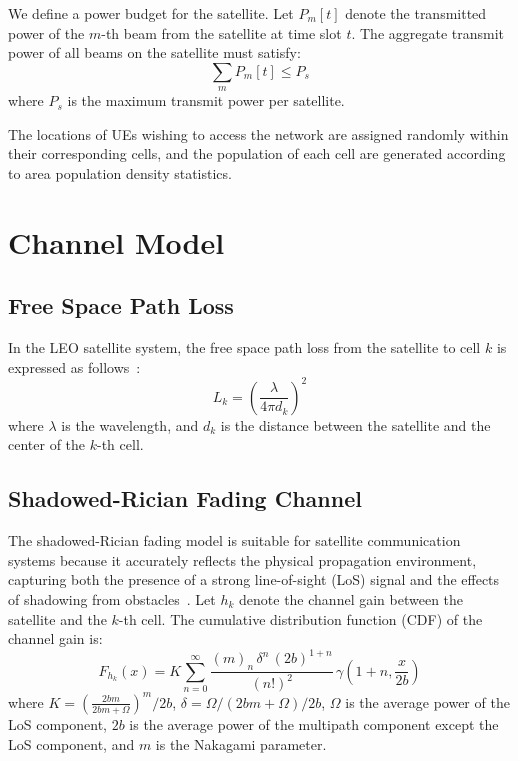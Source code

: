 We define a power budget for the satellite. Let $P_{m}[t]$ denote the transmitted power of the $m$-th beam from the satellite at time slot $t$. The aggregate transmit power of all beams on the satellite must satisfy:
\begin{equation}
    \sum_{m} P_{m}[t] \leq P_s
\end{equation}
where $P_s$ is the maximum transmit power per satellite.

The locations of UEs wishing to access the network are assigned randomly within their corresponding cells, and the population of each cell are generated according to area population density statistics.

\section{Channel Model}

\subsection{Free Space Path Loss}
In the LEO satellite system, the free space path loss from the satellite to cell $k$ is expressed as follows~\cite{Satellite-Multi-Beam}:
\begin{equation}
    L_{k} = \left(\frac{\lambda}{4\pi d_{k}}\right)^2
\end{equation}
where $\lambda$ is the wavelength, and $d_{k}$ is the distance between the satellite and the center of the $k$-th cell.

\subsection{Shadowed-Rician Fading Channel}
The shadowed-Rician fading model is suitable for satellite communication systems because it accurately reflects the physical propagation environment, capturing both the presence of a strong line-of-sight (LoS) signal and the effects of shadowing from obstacles~\cite{channel-model}. Let $h_{k}$ denote the channel gain between the satellite and the $k$-th cell. The cumulative distribution function (CDF) of the channel gain is:
\begin{equation}
    F_{h_{k}}(x) = K \sum_{n=0}^{\infty} \frac{(m)_n \, \delta^n \, (2b)^{1+n}}{(n!)^2} \, \gamma\left(1+n, \frac{x}{2b}\right)
\end{equation}
where $K = \left(\frac{2bm}{2bm+\Omega}\right)^m/2b$, $\delta = \Omega/(2bm+\Omega)/2b$, $\Omega$ is the average power of the LoS component, $2b$ is the average power of the multipath component except the LoS component, and $m$ is the Nakagami parameter.

